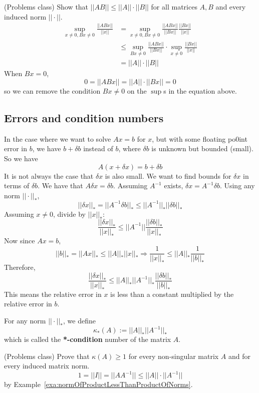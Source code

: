 \begin{example}\label{exa:normOfProductLessThanProductOfNorms}
	(Problems class) Show that $||AB|| \le ||A|| \cdot ||B||$ for all matrices $A, B$ and every induced norm $||\cdot||$.
	\[
		\begin{aligned}
			\sup_{x \ne 0, Bx \ne 0} \frac{||ABx||}{||x||}
				& = \sup_{x \ne 0, Bx \ne 0} \frac{||ABx||}{||Bx||} \frac{||Bx||}{||x||} \\
				& \le \sup_{Bx \ne 0} \frac{||ABx||}{||Bx||} \cdot \sup_{x \ne 0} \frac{||Bx||}{||x||} \\
				& = ||A|| \cdot ||B||
		\end{aligned}
	\]
	When $Bx = 0$,
	\[
		0 = ||ABx|| = ||A|| \cdot ||Bx|| = 0
	\]
	so we can remove the condition $Bx \ne 0$ on the $\sup$s in the equation above.
\end{example}

\subsection{Errors and condition numbers}

In the case where we want to solve $Ax = b$ for $x$, but with some floating po0int error in $b$, we have $b + \delta b$ instead of $b$, where $\delta b$ is unknown but bounded (small). So we have
\[
	A (x + \delta x) = b + \delta b
\]
It is not always the case that $\delta x$ is also small. We want to find bounds for $\delta x$ in terms of $\delta b$. We have that $A \delta x = \delta b$. Assuming $A^{-1}$ exists, $\delta x = A^{-1} \delta b$. Using any norm $||\cdot||_*$,
\[
	||\delta x||_* = ||A^{-1} \delta b||_* \le ||A^{-1}||_* ||\delta b||_*
\]
Assuming $x \ne 0$, divide by $||x||_*$:
\[
	\frac{||\delta x||_*}{||x||_*} \le ||A^{-1}|| \frac{||\delta b||_*}{||x||_*}
\]
Now since $Ax = b$,
\[
	||b||_* = ||A x||_* \le ||A||_* ||x||_* \Longrightarrow \frac{1}{||x||_*} \le ||A||_* \frac{1}{||b||_*}
\]
Therefore,
\[
	\frac{||\delta x||_*}{||x||_*} \le ||A||_* ||A^{-1}||_* \frac{||\delta b||_*}{||b||_*}
\]
This means the relative error in $x$ is less than a constant multiplied by the relative error in $b$.

\begin{definition}
	For any norm $||\cdot||_*$, we define
	\[
		\kappa_* (A) := ||A||_* ||A^{-1}||_*
	\]
	which is called the \textbf{*-condition} number of the matrix $A$.
\end{definition}

\begin{example}
	(Problems class) Prove that $\kappa(A) \ge 1$ for every non-singular matrix $A$ and for every induced matrix norm.
	\[
		1 = ||I|| = ||A A^{-1}|| \le ||A|| \cdot ||A^{-1}||
	\]
	by Example~\ref{exa:normOfProductLessThanProductOfNorms}.
\end{example}

